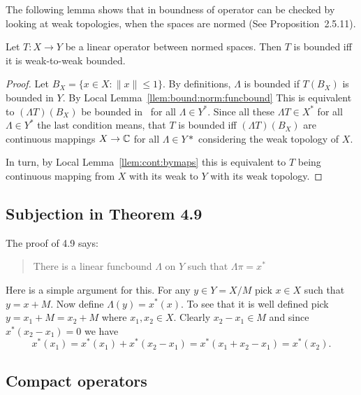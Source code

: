 The following lemma shows that in boundness of operator
can be checked by looking at weak topologies, when the spaces are normed
(See \cite{Megginson1998} Proposition~2.5.11).
\begin{llem} \label{llem:op:normbd:weakbd}
Let \(T:X\to Y\) be a linear operator between normed spaces.
Then $T$ is bounded iff it is weak-to-weak bounded.
\end{llem}
\begin{proof}
Let \(B_X = \{x\in X: \|x\|\leq 1\}\).
By definitions, \(\Lambda\) is bounded if \(T(B_X)\) is bounded in $Y$. 
By Local Lemma~\ref{llem:bound:norm:funcbound} 
This is equivalent to  \((\Lambda T)(B_X)\) be bounded in \C\ for
all \(\Lambda \in Y^*\).
Since all these \(\Lambda T \in X^*\) for all \(\Lambda \in Y^*\)
the last condition means, that $T$ is bounded
iff  \((\Lambda T)(B_X)\) are continuous mappings \(X\to\mathbb{C}\)
for all \(\Lambda \in Y*\) considering the weak topology of $X$.

In turn, by Local Lemma~\ref{llem:cont:bymaps} this is equivalent 
to $T$ being continuous mapping 
from $X$ with its weak to $Y$ with its weak topology.
\end{proof}

\subsection{Subjection in Theorem 4.9}

The proof of 4.9 says:
\begin{quote}
There is a linear funcbound \(\Lambda\) on $Y$ such that
\(\Lambda\pi = x^*\)
\end{quote}
Here is a simple argument for this.
For any \(y \in Y = X/M\) pick \(x\in X\) such that \(y = x + M\).
Now define \(\Lambda(y) = x^*(x)\). To see that it is well defined
pick \(y = x_1 + M = x_2 + M\) where \(x_1,x_2\in X\).
Clearly \(x_2 - x_1 \in M\) and since \(x^*(x_2 - x_1) = 0\) we have
\begin{equation*}
x^*(x_1) = x^*(x_1) + x^*(x_2 - x_1) = x^*(x_1 + x_2 - x_1) = x^*(x_2).
\end{equation*}

\subsection{Compact operators}

